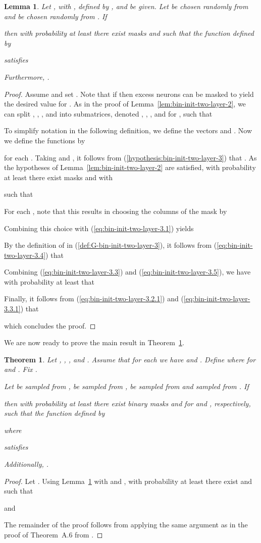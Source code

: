 \documentclass{article} \usepackage{iclr2021_conference,times}
\newtheorem{theorem}{Theorem}
\newtheorem{lemma}{Lemma}
\begin{document}
\begin{lemma} \label{lem:bin-init-two-layer-3}
Let ,  with ,  defined by , and  be given. Let  be chosen randomly from  and  be chosen randomly from . If 

then with probability at least  there exist masks  and  such that the function  defined by

satisfies

Furthermore, .
\end{lemma}
\begin{proof}
Assume  and set . Note that if  then excess neurons can be masked to yield the desired value for . As in the proof of Lemma~\ref{lem:bin-init-two-layer-2}, we can split , , , and  into  submatrices, denoted , , , and  for , such that


To simplify notation in the following definition, we define the vectors  and . Now we define the functions  by

for each . Taking  and , it follows from (\ref{hypothesis:bin-init-two-layer-3}) that . As the hypotheses of Lemma~\ref{lem:bin-init-two-layer-2} are satisfied, with probability at least  there exist masks  and  with 

such that

For each , note that this results in choosing the columns of the mask  by 

Combining this choice with (\ref{eq:bin-init-two-layer-3.1}) yields

By the definition of  in (\ref{def:G-bin-init-two-layer-3}), it follows from (\ref{eq:bin-init-two-layer-3.4}) that

Combining (\ref{eq:bin-init-two-layer-3.3}) and (\ref{eq:bin-init-two-layer-3.5}), we have with probability at least  that

Finally, it follows from (\ref{eq:bin-init-two-layer-3.2.1}) and (\ref{eq:bin-init-two-layer-3.3.1}) that
 
which concludes the proof.
\end{proof}

We are now ready to prove the main result in Theorem~\ref{thm:bin-subnetwork}.

\begin{theorem} \label{thm:bin-subnetwork}
Let , , , and . Assume that for each  we have  and . Define  where  for  and . Fix . 

Let  be sampled from ,  be sampled from ,  be sampled from  and  sampled from . If

then with probability at least  there exist binary masks  and  for  and , respectively, such that the function  defined by

where 
 
satisfies

Additionally, .
\end{theorem}
\begin{proof}
Let . Using Lemma~\ref{lem:bin-init-two-layer-3} with  and , with probability at least  there exist  and  such that 

and

The remainder of the proof follows from applying the same argument as in the proof of Theorem~A.6 from \citep{malach2020proving}.
\end{proof}
\end{document}
